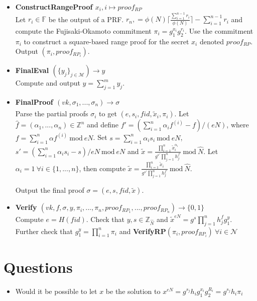 \begin{algorithm}
\begin{itemize}
\item\textbf{ConstructRangeProof $x_i,i \mapsto proof_{RP}$}\\
Let $r_i\in\mathds{F}$ be the output of a PRF. $r_n, = \phi(N)\lceil \frac{\sum_{i=1}^{n-1}r_i}{\phi(N)}\rceil- \sum_{i=1}^{n-1}r_i $ and compute the Fujisaki-Okamoto commitment $\pi_i=g_1^{x_i}g_2^{r_i}$.
Use the commitment $\pi_i$ to construct a square-based range proof for the secret $x_i$ denoted $proof_{RP}$. Output $(\pi_i,proof_{RP_i})$.
 
\item\textbf{FinalEval $(\{y_j\}_{j\in\mathcal{M}})\xrightarrow[]{}y$}\\
Compute and output $y = \sum_{j=1}^m y_{j}$.

\item\textbf{FinalProof $(vk,\sigma_1,...,\sigma_n)\xrightarrow[]{}\sigma$}\\
Parse the partial proofs $\sigma_i$ to get $(e,s_i,fid,\tilde{x}_i,\pi_i)$.  
Let $\hat{f}= (\alpha_1,...,\alpha_n)\in\mathds{Z}^n$ and define $f' = ( \sum_{i=1}^n \alpha_if^(i)-f)/(eN)$, where $f=\sum_{i=1}^n\alpha f^{(i)} \: \text{mod}\:eN$. Set $s= \sum_{i=1}^n\alpha_is_i \: \text{mod}\:eN$, $s' = (\sum_{i=1}^n \alpha_i s_i -s)/eN \: \text{mod}\: eN$ and $\tilde{x} = \frac{\prod_{i=1}^n \tilde{x}_i^{\alpha_i}}{g^{s'}\prod_{j=1}^n h_j ^{f'}} \: \text{mod}\: \hat{N}$. Let $\alpha_i =1 \: \forall i\in\{1,...,n\}$, then compute  $\tilde{x} = \frac{\prod_{i=1}^n \tilde{x}_i}{g^{s'}\prod_{j=1}^n h_j ^{f'}} \: \text{mod}\: \hat{N}$.

Output the final proof $\sigma = (e,s,fid,\tilde{x})$.

\item\textbf{Verify $(vk,f,\sigma,y,\pi_i,...,\pi_n,proof_{RP_1},...,proof_{RP_n})\xrightarrow[]{}\{0,1\}$}\\
Compute $e=H(fid)$. Check that $y,s\in\mathds{Z}_\hat{N}$ and $\tilde{x}^{eN} = g^s\prod_{j=1}^n h_j^{f}g_1^y$. Further check that $g_1^y =\prod_{i=1}^n \pi_i$ and \textbf{VerifyRP}$(\pi_i,proof_{RP_i})\: \forall i\in\mathcal{N}$ 
\end{itemize}
\label{alg:VAHSS-HSS}
\end{algorithm}

\section*{Questions}
\begin{itemize}
\item Would it be possible to let $x$ be the solution to $x^{eN} = g^{s_j}h_ig_1^{x_i}g_2^{R_i} =  g^{s_j}h_i\pi_i $
\end{itemize}
